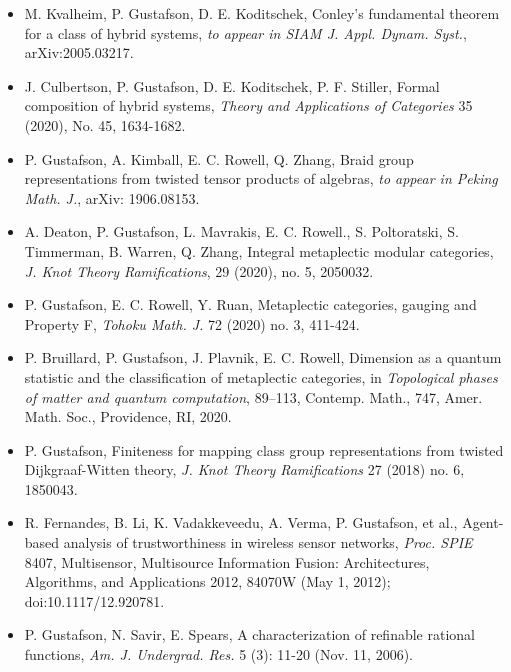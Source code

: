   \begin{itemize}

\item[] M. Kvalheim, P. Gustafson, D. E. Koditschek, {Conley's fundamental theorem for a class of hybrid systems}, \emph{to appear in SIAM J. Appl. Dynam. Syst.}, arXiv:2005.03217.

\item[] J. Culbertson, P. Gustafson, D. E. Koditschek, P. F. Stiller, {Formal composition of hybrid systems}, \emph{Theory and Applications of Categories} {35} (2020), No. 45, 1634-1682.

  \item[] P. Gustafson, A. Kimball, E. C. Rowell, Q. Zhang, {Braid group representations from twisted tensor products of algebras}, \emph{to appear in Peking Math. J.}, arXiv: 1906.08153.

  \item[]  A. Deaton, P. Gustafson, L. Mavrakis, E. C. Rowell., S. Poltoratski, S. Timmerman, B. Warren, Q. Zhang, {Integral metaplectic modular categories}, \emph{J. Knot Theory Ramifications}, 29 (2020), no. 5, 2050032.
  
  \item[] P. Gustafson, E. C. Rowell, Y. Ruan, {Metaplectic categories, gauging and Property F}, \emph{Tohoku Math. J.} {72} (2020) no. 3, 411-424.

  \item[] P. Bruillard, P. Gustafson, J. Plavnik, E. C. Rowell, {Dimension as a quantum statistic and the classification of metaplectic categories}, in \emph{Topological phases of matter and quantum computation}, 89–113, Contemp. Math., 747, Amer. Math. Soc., Providence, RI, 2020.
    
  \item[] P. Gustafson, {Finiteness for mapping class group representations from twisted Dijkgraaf-Witten theory}, \emph{J. Knot Theory Ramifications} 27 (2018) no. 6, 1850043.

  \item[] R. Fernandes, B. Li, K. Vadakkeveedu, A. Verma, P. Gustafson, et al., {Agent-based analysis of trustworthiness in wireless sensor networks}, \emph{Proc. SPIE} {8407}, Multisensor, Multisource Information Fusion: Architectures, Algorithms, and Applications 2012, 84070W (May 1, 2012); doi:10.1117/12.920781. 

 \item[] P. Gustafson, N. Savir, E. Spears, {A characterization of refinable rational functions}, \emph{Am. J. Undergrad. Res.} {5} (3): 11-20 (Nov. 11, 2006).
  
 \end{itemize}
 
